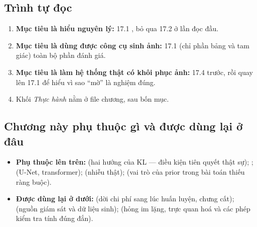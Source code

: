 \documentclass[../../deep_learning.tex]{subfiles}
\begin{document}
\subsection*{Trình tự đọc}
\begin{enumerate}
\item \textbf{Mục tiêu là hiểu nguyên lý:} 17.1  , bỏ qua 17.2 ở lần đọc đầu.
\item \textbf{Mục tiêu là dùng được công cụ sinh ảnh:} 17.1 (chỉ phần bảng và tam giác)  toàn bộ  phần đánh giá.
\item \textbf{Mục tiêu là làm hệ thống thật có khôi phục ảnh:} 17.4 trước, rồi quay lên 17.1 để hiểu vì sao ``mờ'' là nghiệm đúng.
\item Khối \emph{Thực hành} nằm ở file chương, sau bốn mục.
\end{enumerate}

\subsection*{Chương này phụ thuộc gì và được dùng lại ở đâu}
\begin{itemize}
\item \textbf{Phụ thuộc lên trên:}  (hai hướng của KL --- điều kiện tiên quyết thật sự); ;  (U-Net, transformer);  (nhiễu thật);  (vai trò của prior trong bài toán thiếu ràng buộc).
\item \textbf{Được dùng lại ở dưới:}  (dời chi phí sang lúc huấn luyện, chưng cất);  (nguồn giám sát và dữ liệu sinh);  (hỏng im lặng, trực quan hoá và các phép kiểm tra tính đúng đắn).
\end{itemize}
\end{document}
